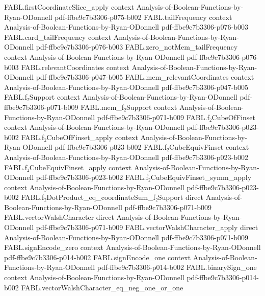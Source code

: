 \begin{theorem}
\proofstep
  {FABL.firstCoordinateSlice_apply}
  {context}
  {Analysis-of-Boolean-Functions-by-Ryan-ODonnell}
  {pdf-ffbe9c7b3306-p075-b002}
\proofstep
  {FABL.tailFrequency}
  {context}
  {Analysis-of-Boolean-Functions-by-Ryan-ODonnell}
  {pdf-ffbe9c7b3306-p076-b003}
\proofstep
  {FABL.card_tailFrequency}
  {context}
  {Analysis-of-Boolean-Functions-by-Ryan-ODonnell}
  {pdf-ffbe9c7b3306-p076-b003}
\proofstep
  {FABL.zero_notMem_tailFrequency}
  {context}
  {Analysis-of-Boolean-Functions-by-Ryan-ODonnell}
  {pdf-ffbe9c7b3306-p076-b003}
\proofstep
  {FABL.relevantCoordinates}
  {context}
  {Analysis-of-Boolean-Functions-by-Ryan-ODonnell}
  {pdf-ffbe9c7b3306-p047-b005}
\proofstep
  {FABL.mem_relevantCoordinates}
  {context}
  {Analysis-of-Boolean-Functions-by-Ryan-ODonnell}
  {pdf-ffbe9c7b3306-p047-b005}
\proofstep
  {FABL.f₂Support}
  {context}
  {Analysis-of-Boolean-Functions-by-Ryan-ODonnell}
  {pdf-ffbe9c7b3306-p071-b009}
\proofstep
  {FABL.mem_f₂Support}
  {context}
  {Analysis-of-Boolean-Functions-by-Ryan-ODonnell}
  {pdf-ffbe9c7b3306-p071-b009}
\proofstep
  {FABL.f₂CubeOfFinset}
  {context}
  {Analysis-of-Boolean-Functions-by-Ryan-ODonnell}
  {pdf-ffbe9c7b3306-p023-b002}
\proofstep
  {FABL.f₂CubeOfFinset_apply}
  {context}
  {Analysis-of-Boolean-Functions-by-Ryan-ODonnell}
  {pdf-ffbe9c7b3306-p023-b002}
\proofstep
  {FABL.f₂CubeEquivFinset}
  {context}
  {Analysis-of-Boolean-Functions-by-Ryan-ODonnell}
  {pdf-ffbe9c7b3306-p023-b002}
\proofstep
  {FABL.f₂CubeEquivFinset_apply}
  {context}
  {Analysis-of-Boolean-Functions-by-Ryan-ODonnell}
  {pdf-ffbe9c7b3306-p023-b002}
\proofstep
  {FABL.f₂CubeEquivFinset_symm_apply}
  {context}
  {Analysis-of-Boolean-Functions-by-Ryan-ODonnell}
  {pdf-ffbe9c7b3306-p023-b002}
\proofstep
  {FABL.f₂DotProduct_eq_coordinateSum_f₂Support}
  {direct}
  {Analysis-of-Boolean-Functions-by-Ryan-ODonnell}
  {pdf-ffbe9c7b3306-p071-b009}
\proofstep
  {FABL.vectorWalshCharacter}
  {direct}
  {Analysis-of-Boolean-Functions-by-Ryan-ODonnell}
  {pdf-ffbe9c7b3306-p071-b009}
\proofstep
  {FABL.vectorWalshCharacter_apply}
  {direct}
  {Analysis-of-Boolean-Functions-by-Ryan-ODonnell}
  {pdf-ffbe9c7b3306-p071-b009}
\proofstep
  {FABL.signEncode_zero}
  {context}
  {Analysis-of-Boolean-Functions-by-Ryan-ODonnell}
  {pdf-ffbe9c7b3306-p014-b002}
\proofstep
  {FABL.signEncode_one}
  {context}
  {Analysis-of-Boolean-Functions-by-Ryan-ODonnell}
  {pdf-ffbe9c7b3306-p014-b002}
\proofstep
  {FABL.binarySign_one}
  {context}
  {Analysis-of-Boolean-Functions-by-Ryan-ODonnell}
  {pdf-ffbe9c7b3306-p014-b002}
\proofstep
  {FABL.vectorWalshCharacter_eq_neg_one_or_one}

\end{theorem}
